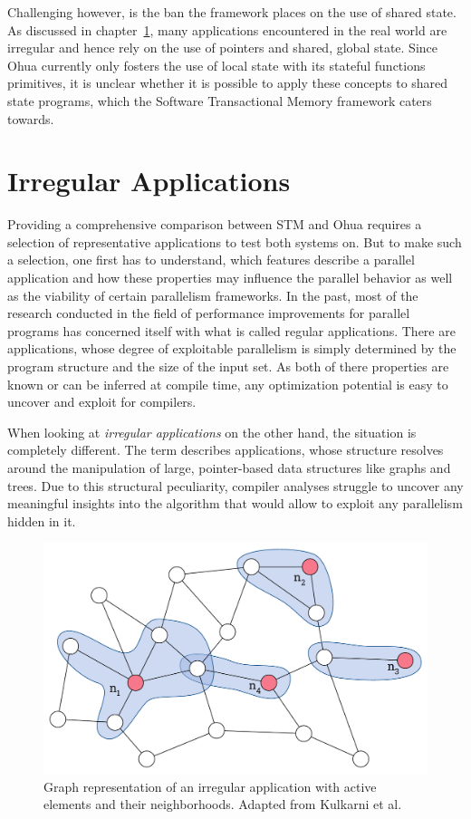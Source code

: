 Challenging however, is the ban the framework places on the use of shared state.
As discussed in chapter~\ref{sec:background:irregular}, many applications encountered in the real world are irregular and hence rely on the use of pointers and shared, global state.
Since Ohua currently only fosters the use of local state with its stateful functions primitives, it is unclear whether it is possible to apply these concepts to shared state programs, which the Software Transactional Memory framework caters towards.


\section{Irregular Applications}
\label{sec:background:irregular}

Providing a comprehensive comparison between STM and Ohua requires a selection of representative applications to test both systems on.
But to make such a selection, one first has to understand, which features describe a parallel application and how these properties may influence the parallel behavior as well as the viability of certain parallelism frameworks.
In the past, most of the research conducted in the field of performance improvements for parallel programs has concerned itself with what is called regular applications.
There are applications, whose degree of exploitable parallelism is simply determined by the program structure and the size of the input set.
As both of there properties are known or can be inferred at compile time, any optimization potential is easy to uncover and exploit for compilers.

When looking at \emph{irregular applications} on the other hand, the situation is completely different.
The term describes applications, whose structure resolves around the manipulation of large, pointer-based data structures like graphs and trees.
Due to this structural peculiarity, compiler analyses struggle to uncover any meaningful insights into the algorithm that would allow to exploit any parallelism hidden in it.

\begin{figure}[b]
    \centering
    \includegraphics[width=.7\textwidth,keepaspectratio]{gfx/background-irregular}
    \caption{Graph representation of an irregular application with active elements and their neighborhoods. Adapted from Kulkarni et al.~\cite{kulkarni2009much}}%
    \label{fig:background:irregular}
\end{figure}

